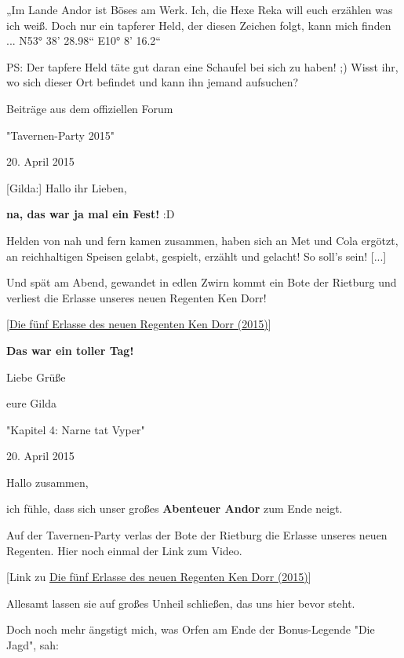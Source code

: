 \documentclass[10pt, a4paper, oneside]{book}
\newcommand{\refstorytext}[1]{\hyperref[Storytext: #1]{#1}}
\begin{document}
\begin{multicols}{2}
„Im Lande Andor ist Böses am Werk. Ich, die Hexe Reka will euch erzählen was ich weiß. Doch nur ein tapferer Held, der diesen Zeichen folgt, kann mich finden ... N53° 38' 28.98“ E10° 8' 16.2“ 

PS: Der tapfere Held täte gut daran eine Schaufel bei sich zu haben! ;) Wisst ihr, wo sich dieser Ort befindet und kann ihn jemand aufsuchen?

\begin{center}
    Beiträge aus dem offiziellen Forum

    "Tavernen-Party 2015"
    
    20. April 2015
\end{center}

[Gilda:] Hallo ihr Lieben,

\textbf{na, das war ja mal ein Fest!} :D

Helden von nah und fern kamen zusammen, haben sich an Met und Cola ergötzt, an reichhaltigen Speisen gelabt, gespielt, erzählt und gelacht! So soll's sein! [...]

Und spät am Abend, gewandet in edlen Zwirn kommt ein Bote der Rietburg und verliest die Erlasse unseres neuen Regenten Ken Dorr!

[\refstorytext{Die fünf Erlasse des neuen Regenten Ken Dorr (2015)}]


\textbf{Das war ein toller Tag!}


Liebe Grüße

eure Gilda







\begin{center}
    "Kapitel 4: Narne tat Vyper"

    20. April 2015
\end{center}

Hallo zusammen,

ich fühle, dass sich unser großes \textbf{Abenteuer Andor} zum Ende neigt.

Auf der Tavernen-Party verlas der Bote der Rietburg die Erlasse unseres neuen Regenten. Hier noch einmal der Link zum Video.

[Link zu \refstorytext{Die fünf Erlasse des neuen Regenten Ken Dorr (2015)}]

Allesamt lassen sie auf großes Unheil schließen, das uns hier bevor steht.

Doch noch mehr ängstigt mich, was Orfen am Ende der Bonus-Legende "Die Jagd", sah:


\end{multicols}
\end{document}
